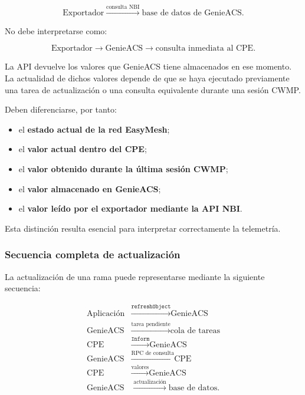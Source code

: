\[
    \text{Exportador}
    \xrightarrow{\text{consulta NBI}}
    \text{base de datos de GenieACS}.
\]

No debe interpretarse como:

\[
    \text{Exportador}
    \longrightarrow
    \text{GenieACS}
    \longrightarrow
    \text{consulta inmediata al CPE}.
\]

La API devuelve los valores que GenieACS tiene almacenados en ese
momento. La actualidad de dichos valores depende de que se haya ejecutado
previamente una tarea de actualización o una consulta equivalente durante
una sesión CWMP.

Deben diferenciarse, por tanto:

\begin{itemize}
    \item el \textbf{estado actual de la red EasyMesh};
    \item el \textbf{valor actual dentro del CPE};
    \item el \textbf{valor obtenido durante la última sesión CWMP};
    \item el \textbf{valor almacenado en GenieACS};
    \item el \textbf{valor leído por el exportador mediante la API NBI}.
\end{itemize}

Esta distinción resulta esencial para interpretar correctamente la
telemetría.


\subsubsection*{Secuencia completa de actualización}

La actualización de una rama puede representarse mediante la siguiente
secuencia:

\[
\begin{aligned}
    \text{Aplicación}
    &\xrightarrow{\texttt{refreshObject}}
    \text{GenieACS}\\
    \text{GenieACS}
    &\xrightarrow{\text{tarea pendiente}}
    \text{cola de tareas}\\
    \text{CPE}
    &\xrightarrow{\texttt{Inform}}
    \text{GenieACS}\\
    \text{GenieACS}
    &\xrightarrow{\text{RPC de consulta}}
    \text{CPE}\\
    \text{CPE}
    &\xrightarrow{\text{valores}}
    \text{GenieACS}\\
    \text{GenieACS}
    &\xrightarrow{\text{actualización}}
    \text{base de datos}.
\end{aligned}
\]

